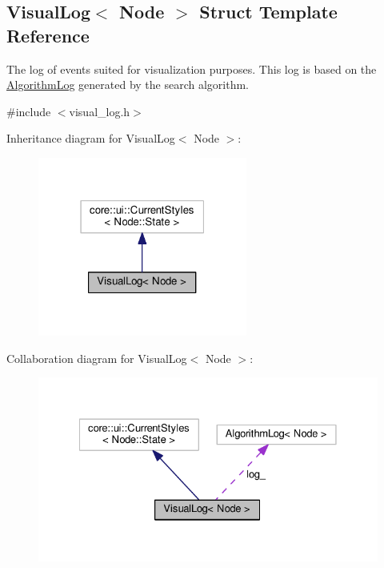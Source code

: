 \hypertarget{structVisualLog}{}\subsection{Visual\+Log$<$ Node $>$ Struct Template Reference}
\label{structVisualLog}


The log of events suited for visualization purposes. This log is based on the \hyperlink{structAlgorithmLog}{Algorithm\+Log} generated by the search algorithm.  




{\ttfamily \#include $<$visual\+\_\+log.\+h$>$}



Inheritance diagram for Visual\+Log$<$ Node $>$\+:\nopagebreak
\begin{figure}[H]
\begin{center}
\leavevmode
\includegraphics[width=195pt]{structVisualLog__inherit__graph}
\end{center}
\end{figure}


Collaboration diagram for Visual\+Log$<$ Node $>$\+:\nopagebreak
\begin{figure}[H]
\begin{center}
\leavevmode
\includegraphics[width=328pt]{structVisualLog__coll__graph}
\end{center}
\end{figure}

